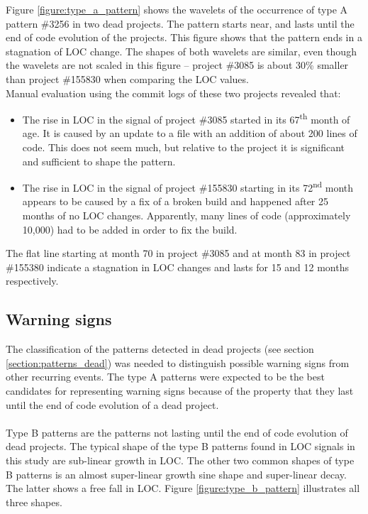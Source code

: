 

\indent
Figure \ref{figure:type_a_pattern} shows the wavelets of the occurrence of type
A pattern \#3256 in two dead projects. The pattern starts near, and lasts until
the end of code evolution of the projects. This figure shows that the pattern
ends in a stagnation of LOC change. The shapes of both wavelets are similar,
even though the wavelets are not scaled in this figure -- project \#3085 is
about 30\% smaller than project \#155830 when comparing the LOC values.\\

\noindent
Manual evaluation using the commit logs of these two projects revealed that:

\begin{itemize}
	\item The rise in LOC in the signal of project \#3085 started in its
		67\textsuperscript{th} month of age. It is caused by an update to a file
		with an addition of about 200 lines of code. This does not seem much, but
		relative to the project it is significant and sufficient to shape the
		pattern.

	\item The rise in LOC in the signal of project \#155830 starting in its
		72\textsuperscript{nd} month appears to be caused by a fix of a broken build
		and happened after 25 months of no LOC changes. Apparently, many lines of
		code (approximately 10,000) had to be added in order to fix the build.
\end{itemize}

\noindent
The flat line starting at month 70 in project \#3085 and at month 83 in project
\#155380 indicate a stagnation in LOC changes and lasts for 15 and 12 months
respectively.

\subsection{Warning signs}
The classification of the patterns detected in dead projects (see section
\ref{section:patterns_dead}) was needed to distinguish possible warning signs
from other recurring events. The type A patterns were expected to be the best
candidates for representing warning signs because of the property that they
last until the end of code evolution of a dead project.

\paragraph{}
Type B patterns are the patterns not lasting until the end of code evolution of
dead projects. The typical shape of the type B patterns found in LOC signals in
this study are sub-linear growth in LOC. The other two common shapes of type B
patterns is an almost super-linear growth sine shape and super-linear decay.
The latter shows a free fall in LOC. Figure \ref{figure:type_b_pattern}
illustrates all three shapes.

